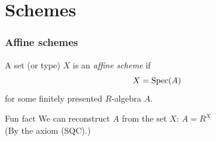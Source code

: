 \documentclass[aspectratio=1610]{beamer}
\begin{document}
\section{Schemes}

\begin{frame}
  \frametitle{Affine schemes}

  \pause%
  \begin{definition}
    A set (or type) $X$ is an \emph{affine scheme} if
    \[ X = \operatorname{Spec}(A) \]
    for some finitely presented $R$-algebra $A$.
  \end{definition}

  \pause%
  \bigskip
  \begin{block}{Fun fact}
    We can reconstruct $A$ from the set $X$: $A = R^X$\\
    (By the axiom (SQC).)
  \end{block}
\end{frame}
\end{document}
